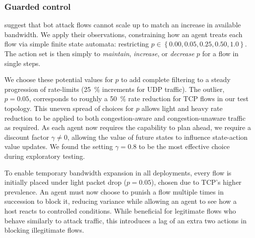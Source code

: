 \documentclass[10pt, times, conference, letterpaper]{IEEEtran}
\begin{document}
\subsubsection{Guarded control}
\Textcite{DBLP:conf/ndss/KangGS16} suggest that bot attack flows cannot scale up to match an increase in available bandwidth.
We apply their observations, constraining how an agent treats each flow via simple finite state automata: restricting $p \in \left\{ 0.00, 0.05, 0.25, 0.50, 1.0 \right\}$.
The action set is then simply to \emph{maintain}, \emph{increase}, or \emph{decrease} $p$ for a flow in single steps.

We choose these potential values for $p$ to add complete filtering to a steady progression of rate-limits (\SI{25}{\percent} increments for UDP traffic).
The outlier, $p=0.05$, corresponds to roughly a \SI{50}{\percent} rate reduction for TCP flows in our test topology.
This uneven spread of choices for $p$ allows light and heavy rate reduction to be applied to both congestion-aware and congestion-unaware traffic as required.
As each agent now requires the capability to plan ahead, we require a discount factor $\gamma \ne 0$, allowing the value of future states to influence state-action value updates.
We found the setting $\gamma = 0.8$ to be the most effective choice during exploratory testing.

To enable temporary bandwidth expansion in all deployments, every flow is initially placed under light packet drop ($p=0.05$), chosen due to TCP's higher prevalence.
An agent must now choose to punish a flow multiple times in succession to block it, reducing variance while allowing an agent to see how a host reacts to controlled conditions.
While beneficial for legitimate flows who behave similarly to attack traffic, this introduces a lag of an extra two actions in blocking illegitimate flows.
\end{document}
